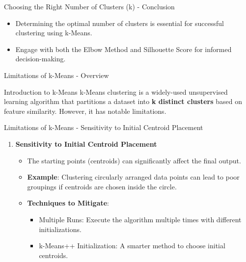\documentclass[aspectratio=169]{beamer}
\begin{document}
\begin{frame}[fragile]{Choosing the Right Number of Clusters (k) - Conclusion}
    \begin{itemize}
        \item Determining the optimal number of clusters is essential for successful clustering using k-Means.
        \item Engage with both the Elbow Method and Silhouette Score for informed decision-making.
    \end{itemize}
\end{frame}

\begin{frame}[fragile]{Limitations of k-Means - Overview}
    \begin{block}{Introduction to k-Means}
        k-Means clustering is a widely-used unsupervised learning algorithm that partitions a dataset into \textbf{k distinct clusters} based on feature similarity. However, it has notable limitations.
    \end{block}
\end{frame}

\begin{frame}[fragile]{Limitations of k-Means - Sensitivity to Initial Centroid Placement}
    \begin{enumerate}
        \item \textbf{Sensitivity to Initial Centroid Placement}
        \begin{itemize}
            \item The starting points (centroids) can significantly affect the final output.
            \item \textbf{Example}: Clustering circularly arranged data points can lead to poor groupings if centroids are chosen inside the circle.
            \item \textbf{Techniques to Mitigate}:
            \begin{itemize}
                \item Multiple Runs: Execute the algorithm multiple times with different initializations.
                \item k-Means++ Initialization: A smarter method to choose initial centroids.
            \end{itemize}
        \end{itemize}
    \end{enumerate}
\end{frame}
\end{document}
